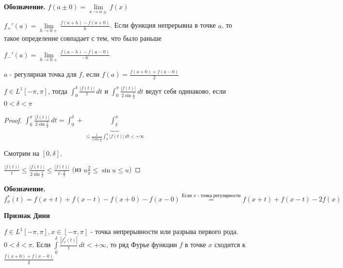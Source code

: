 \textbf{Обозначение. } $f(a \pm 0) = \lim\limits_{x \to a\pm} f(x)$

$f_+' (a) = \lim\limits_{h \to 0+} \frac{f(a + h) - f(a + 0)}{h}$. Если функция непрерывна в точке $a$, то такое определение совпадает с тем, что было раньше

$f_-' (a) = \lim\limits_{h \to 0+} \frac{f(a - h) - f(a - 0)}{-h}$

\begin{definition}
    $a$ - регулярная точка для $f$, если $f(a) = \frac{f(a + 0) + f(a - 0)}{2}$
\end{definition}

\begin{lemma}
    $f \in L^1 [-\pi, \pi]$, тогда $\int_0^\delta \frac{|f(t)|}{t} \, dt$ и $\int_0^\pi \frac{|f(t)|}{2\sin \frac{t}{2}} \, dt$ ведут себя одинаково, 
    если $0 < \delta < \pi$
\end{lemma}

\begin{proof}
    $\int_0^\pi \frac{|f(t)|}{2\sin \frac{t}{2}} \, dt = \int_0^\delta + \underbrace{\int_\delta^\pi}_{\leqslant \frac{1}{2\sin \frac{\delta}{2}} \int_\delta^\pi |f(t)| \, dt < +\infty } $

    Смотрим на $[0, \delta]$.
    
    $\frac{|f(t)|}{t} \leqslant \frac{|f(t)|}{2 \sin \frac{t}{2}} \leqslant \frac{|f(t)|}{t \cdot \frac{2}{\pi}}$ (из $u \frac{2}{\pi} \leqslant \sin u \leqslant u$)
\end{proof}

\textbf{Обозначение. }  $f_x^* (t) = f(x + t) + f(x - t) - f(x + 0) - f(x - 0) \overset{\text{Если $x$ - точка регулярности}}{=} f(x + t) + f(x - t) - 2f(x)$

\begin{theorem}
    \textbf{Признак Дини}

    $f \in L^{1} [-\pi, \pi], x \in [-\pi, \pi]$ - точка непрерывности или разрыва первого рода. $0 < \delta < \pi$. Если $\int\limits_0^\delta \frac{|f_x^* (t)|}{t} \, dt < +\infty$, то ряд Фурье 
    функции $f$ в точке $x$ сходится к $\frac{f(x + 0) + f(x - 0)}{2}$
\end{theorem}

